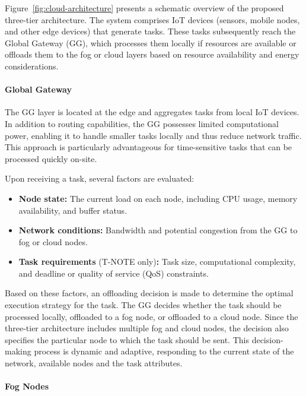 \documentclass{svproc}
\begin{document}
Figure~\ref{fig:cloud-architecture} presents a schematic overview of the proposed three-tier architecture. The system comprises IoT devices (sensors, mobile nodes, and other edge devices) that generate tasks. These tasks subsequently reach the Global Gateway (GG), which processes them locally if resources are available or offloads them to the fog or cloud layers based on resource availability and energy considerations.

\paragraph{Global Gateway}\label{subsubsec:GG}

The GG layer is located at the edge and aggregates tasks from local IoT devices. In addition to routing capabilities, the GG possesses limited computational power, enabling it to handle smaller tasks locally and thus reduce network traffic. This approach is particularly advantageous for time-sensitive tasks that can be processed quickly on-site.

Upon receiving a task, several factors are evaluated:
\begin{itemize}
    \item \textbf{Node state:} The current load on each node, including CPU usage, memory availability, and buffer status.
    \item \textbf{Network conditions:} Bandwidth and potential congestion from the GG to fog or cloud nodes.
    \item \textbf{Task requirements} (T-NOTE only)\textbf{:} Task size, computational complexity, and deadline or quality of service (QoS) constraints.
\end{itemize}

Based on these factors, an offloading decision is made to determine the optimal execution strategy for the task. The GG decides whether the task should be processed locally, offloaded to a fog node, or offloaded to a cloud node. Since the three-tier architecture includes multiple fog and cloud nodes, the decision also specifies the particular node to which the task should be sent. This decision-making process is dynamic and adaptive, responding to the current state of the network, available nodes and the task attributes.



\paragraph{Fog Nodes}\label{subsubsec:Fog}
\end{document}

